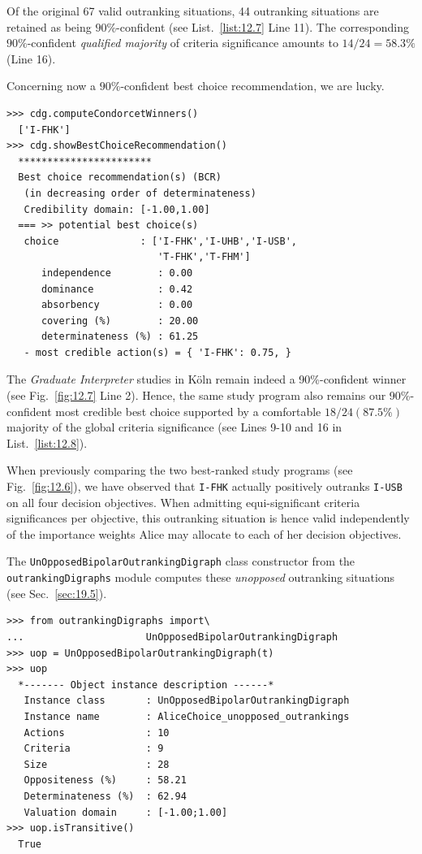 Of the original 67 valid outranking situations, 44 outranking situations are retained as being $90\%$-confident (see List.~\vref{list:12.7} Line 11). The corresponding $90\%$-confident \emph{qualified majority} of criteria significance amounts to $14/24 = 58.3\%$ (Line 16).  

Concerning now a $90\%$-confident best choice recommendation, we are lucky. 
\begin{lstlisting}[caption={Computing the $90\%$-confident best choice recommendation.},label=list:12.8]
>>> cdg.computeCondorcetWinners()
  ['I-FHK']
>>> cdg.showBestChoiceRecommendation()
  ***********************
  Best choice recommendation(s) (BCR)
   (in decreasing order of determinateness)   
   Credibility domain: [-1.00,1.00]
  === >> potential best choice(s)
   choice              : ['I-FHK','I-UHB','I-USB',
                          'T-FHK','T-FHM']
      independence        : 0.00
      dominance           : 0.42
      absorbency          : 0.00
      covering (%)        : 20.00
      determinateness (%) : 61.25
   - most credible action(s) = { 'I-FHK': 0.75, }
\end{lstlisting}

The \emph{Graduate Interpreter} studies in Köln remain indeed a 90\%-confident \Condorcet winner (see Fig.~\vref{fig:12.7} Line 2). Hence, the same study program also remains our 90\%-confident most credible best choice supported by a comfortable $18/24 (87.5\%)$ majority of the global criteria significance (see Lines 9-10 and 16 in List.~\vref{list:12.8}).

When previously comparing the two best-ranked study programs (see Fig.~\vref{fig:12.6}), we have observed that \texttt{I-FHK} actually positively outranks \texttt{I-USB} on all four decision objectives. When admitting equi-significant criteria significances per objective, this outranking situation is hence valid independently of the importance weights Alice may allocate to each of her decision objectives. 

The \texttt{UnOpposedBipolarOutrankingDigraph} class constructor from the \texttt{outrankingDigraphs} module computes these \emph{unopposed} outranking situations (see Sec.~\ref{sec:19.5}).
\begin{lstlisting}[caption={Computing the unopposed outranking situations},label=list:12.9]
>>> from outrankingDigraphs import\
...                     UnOpposedBipolarOutrankingDigraph
>>> uop = UnOpposedBipolarOutrankingDigraph(t)
>>> uop
  *------- Object instance description ------*
   Instance class       : UnOpposedBipolarOutrankingDigraph
   Instance name        : AliceChoice_unopposed_outrankings
   Actions              : 10
   Criteria             : 9
   Size                 : 28
   Oppositeness (%)     : 58.21
   Determinateness (%)  : 62.94
   Valuation domain     : [-1.00;1.00]
>>> uop.isTransitive()
  True
\end{lstlisting}

